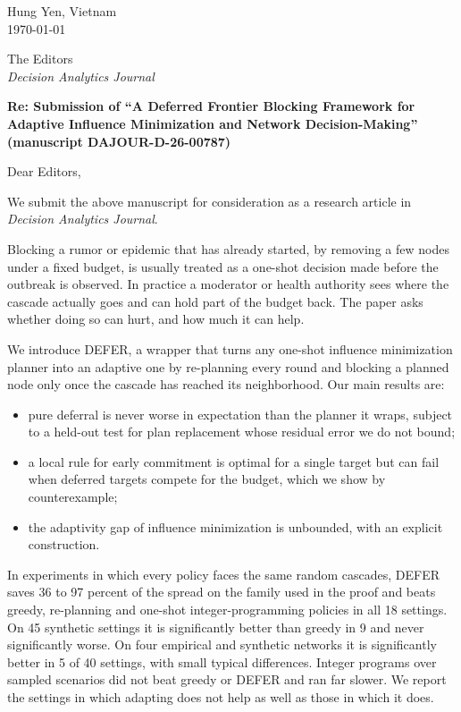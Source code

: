 \documentclass[11pt]{article}
\begin{document}
Hung Yen, Vietnam\\
\today

The Editors\\
\textit{Decision Analytics Journal}

\textbf{Re: Submission of ``A Deferred Frontier Blocking Framework for Adaptive Influence Minimization and Network Decision-Making'' (manuscript DAJOUR-D-26-00787)}

Dear Editors,

We submit the above manuscript for consideration as a research article in \textit{Decision Analytics Journal}.

Blocking a rumor or epidemic that has already started, by removing a few nodes under a fixed budget, is usually treated as a one-shot decision made before the outbreak is observed. In practice a moderator or health authority sees where the cascade actually goes and can hold part of the budget back. The paper asks whether doing so can hurt, and how much it can help.

We introduce DEFER, a wrapper that turns any one-shot influence minimization planner into an adaptive one by re-planning every round and blocking a planned node only once the cascade has reached its neighborhood. Our main results are:
\begin{itemize}
\item pure deferral is never worse in expectation than the planner it wraps, subject to a held-out test for plan replacement whose residual error we do not bound;
\item a local rule for early commitment is optimal for a single target but can fail when deferred targets compete for the budget, which we show by counterexample;
\item the adaptivity gap of influence minimization is unbounded, with an explicit construction.
\end{itemize}
In experiments in which every policy faces the same random cascades, DEFER saves 36 to 97 percent of the spread on the family used in the proof and beats greedy, re-planning and one-shot integer-programming policies in all 18 settings. On 45 synthetic settings it is significantly better than greedy in 9 and never significantly worse. On four empirical and synthetic networks it is significantly better in 5 of 40 settings, with small typical differences. Integer programs over sampled scenarios did not beat greedy or DEFER and ran far slower. We report the settings in which adapting does not help as well as those in which it does.
\end{document}
